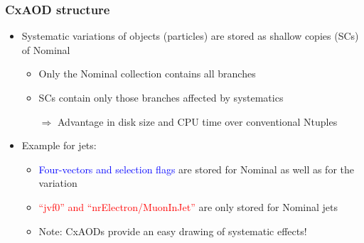 \documentclass{beamer}
\begin{document}
\begin{frame}[fragile]
\frametitle{CxAOD structure}
\begin{itemize}
 \item Systematic variations of objects (particles) are stored as shallow copies (SCs) of Nominal
\begin{itemize}
\scriptsize
 \item Only the Nominal collection contains all branches
 \item SCs contain only those branches affected by systematics
 \item[$\Rightarrow$] Advantage in disk size and CPU time over conventional Ntuples
\end{itemize}
\item Example for jets:
\begin{itemize}
\scriptsize
 \item \textcolor{blue}{Four-vectors and selection flags} are stored for Nominal as well as for the variation
 \item \textcolor{red}{``jvf0'' and ``nrElectron/MuonInJet''} are only stored for Nominal jets
 \item Note: CxAODs provide an easy drawing of systematic effects!
\end{itemize}
\end{itemize}
\begin{center}
\end{center}
\end{frame}
\end{document}
